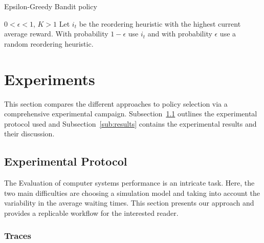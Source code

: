 \documentclass[sigconf]{acmart}
\begin{document}
\begin{algorithm}[h]
  \caption{Epsilon-Greedy Bandit policy}
  \begin{algorithmic}[1]
    \renewcommand{\algorithmicrequire}{\textbf{Input:}}
    \renewcommand{\algorithmicensure}{\textbf{Output:}}
    \REQUIRE $0 < \epsilon < 1$, $K>1$
    \STATE Let $i_t$ be the reordering heuristic with the highest current
    average reward.
    \STATE With probability $1-\epsilon$ use $i_t$ and with probability
    $\epsilon$ use a random reordering heuristic.
    \ENDFOR
  \end{algorithmic}
  \label{alg:epsg}
\end{algorithm}



\section{Experiments}
\label{sec:experiments}

This section compares the different approaches to policy selection via a
comprehensive experimental campaign.  Subsection~\ref{sub:protocol} outlines
the experimental protocol used and Subsection~\ref{sub:results} contains the
experimental results and their discussion.

\subsection{Experimental Protocol}
\label{sub:protocol}

The Evaluation of computer systems performance is an intricate
task\cite{feitbook}. Here, the two main difficulties are choosing a simulation
model and taking into account the variability in the average waiting times.
This section presents our approach and provides a replicable workflow
for the interested reader.

\subsubsection{Traces}
\label{sub:traces}
\end{document}
